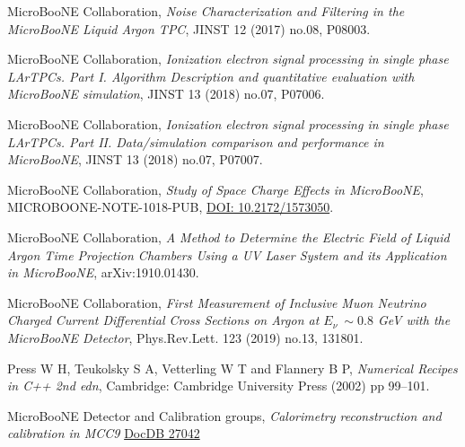 \documentclass[a4paper]{article}
\begin{document}
\begin{thebibliography}{}
MicroBooNE Collaboration, \emph{Noise Characterization and Filtering in the MicroBooNE Liquid Argon TPC}, JINST 12 (2017) no.08, P08003.

MicroBooNE Collaboration, \emph{Ionization electron signal processing in single phase LArTPCs. Part I. Algorithm Description and quantitative evaluation with MicroBooNE simulation}, JINST 13 (2018) no.07, P07006.

MicroBooNE Collaboration, \emph{Ionization electron signal processing in single phase LArTPCs. Part II. Data/simulation comparison and performance in MicroBooNE}, JINST 13 (2018) no.07, P07007.

MicroBooNE Collaboration, \emph{Study of Space Charge Effects in MicroBooNE}, MICROBOONE-NOTE-1018-PUB, \href{http://inspirehep.net/record/1763018}{DOI: 10.2172/1573050}.

MicroBooNE Collaboration, \emph{A Method to Determine the Electric Field of Liquid Argon Time Projection Chambers Using a UV Laser System and its Application in MicroBooNE},  arXiv:1910.01430.

MicroBooNE Collaboration, \emph{First Measurement of Inclusive Muon Neutrino Charged Current Differential Cross Sections on Argon at $E_\nu ~\sim0.8$ GeV with the MicroBooNE Detector}, Phys.Rev.Lett. 123 (2019) no.13, 131801.

Press W H, Teukolsky S A, Vetterling W T and Flannery B P, \emph{Numerical Recipes in C++ 2nd edn}, Cambridge: Cambridge University Press (2002) pp 99–101.

MicroBooNE Detector and Calibration groups, \emph{Calorimetry reconstruction and calibration in MCC9}
\href{https://microboone-docdb.fnal.gov/cgi-bin/private/ShowDocument?docid=27042}{DocDB 27042}

\end{thebibliography}
\end{document}
